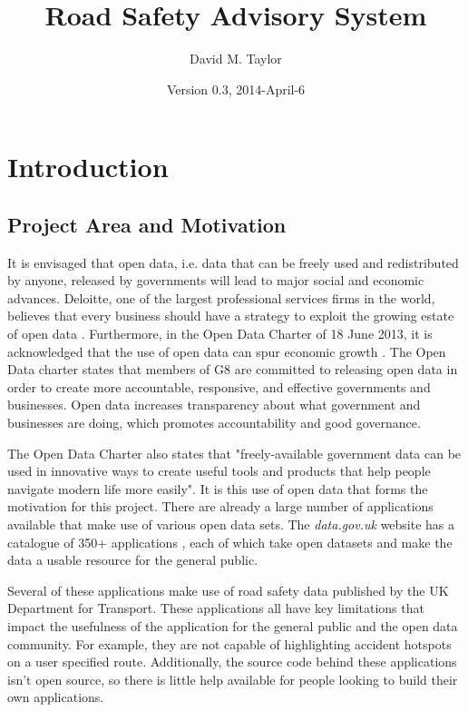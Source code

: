 \documentclass[authoryearcitations]{UoYCSproject}
\author{David M. Taylor}
\title{Road Safety Advisory System}
\date{Version 0.3, 2014-April-6}
\begin{document}
\maketitle
\listoffigures
\listoftables
\renewcommand*{\lstlistlistingname}{List of Listings}
\lstlistoflistings

\cleardoublepage
\label{sec:start}
\thispagestyle{empty}\cleardoublepage

\chapter{Introduction}

\section{Project Area and Motivation}

It is envisaged that open data, i.e. data that can be freely used and redistributed by anyone, released by governments will lead to major social and economic advances. Deloitte, one of the largest professional services firms in the world, believes that every business should have a strategy to exploit the growing estate of open data \citep{DeloitteAnalytics2012}. Furthermore, in the Open Data Charter of 18 June 2013, it is acknowledged that the use of open data can spur economic growth \citep{CabinetOffice2013}. The Open Data charter states that members of G8 are committed to releasing open data in order to create more accountable, responsive, and effective governments and businesses. Open data increases transparency about what government and businesses are doing, which promotes accountability and good governance.

The Open Data Charter also states that "freely-available government data can be used in innovative ways to create useful tools and products that help people navigate modern life more easily". It is this use of open data that forms the motivation for this project. There are already a large number of applications available that make use of various open data sets. The \textit{data.gov.uk} website has a catalogue of 350+ applications \citep{Data.go}, each of which take open datasets and make the data a usable resource for the general public. 

Several of these applications make use of road safety data published by the UK Department for Transport. These applications all have key limitations that impact the usefulness of the application for the general public and the open data community. For example, they are not capable of highlighting accident hotspots on a user specified route. Additionally, the source code behind these applications isn't open source, so there is little help available for people looking to build their own applications.
\end{document}
